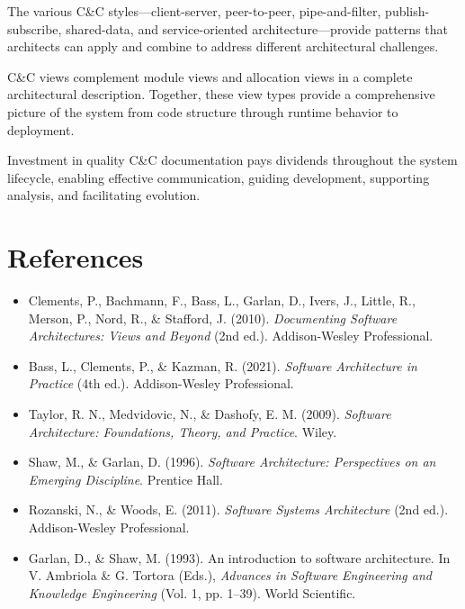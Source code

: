 \documentclass[11pt]{article}
\begin{document}
The various C\&C styles---client-server, peer-to-peer, pipe-and-filter, publish-subscribe, shared-data, and service-oriented architecture---provide patterns that architects can apply and combine to address different architectural challenges.

C\&C views complement module views and allocation views in a complete architectural description. Together, these view types provide a comprehensive picture of the system from code structure through runtime behavior to deployment.

Investment in quality C\&C documentation pays dividends throughout the system lifecycle, enabling effective communication, guiding development, supporting analysis, and facilitating evolution.

\section*{References}

\begin{itemize}
  \item Clements, P., Bachmann, F., Bass, L., Garlan, D., Ivers, J., Little, R., Merson, P., Nord, R., \& Stafford, J. (2010). \textit{Documenting Software Architectures: Views and Beyond} (2nd ed.). Addison-Wesley Professional.
  \item Bass, L., Clements, P., \& Kazman, R. (2021). \textit{Software Architecture in Practice} (4th ed.). Addison-Wesley Professional.
  \item Taylor, R. N., Medvidovic, N., \& Dashofy, E. M. (2009). \textit{Software Architecture: Foundations, Theory, and Practice}. Wiley.
  \item Shaw, M., \& Garlan, D. (1996). \textit{Software Architecture: Perspectives on an Emerging Discipline}. Prentice Hall.
  \item Rozanski, N., \& Woods, E. (2011). \textit{Software Systems Architecture} (2nd ed.). Addison-Wesley Professional.
  \item Garlan, D., \& Shaw, M. (1993). An introduction to software architecture. In V. Ambriola \& G. Tortora (Eds.), \textit{Advances in Software Engineering and Knowledge Engineering} (Vol. 1, pp. 1--39). World Scientific.
\end{itemize}

\listoffigures
\end{document}
